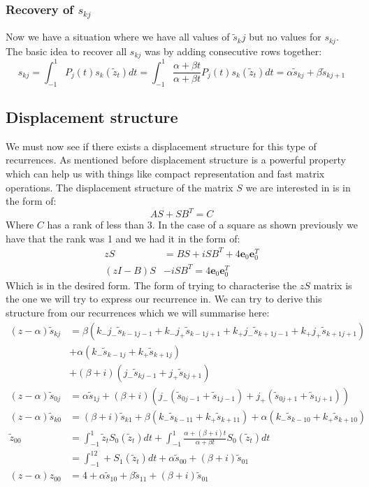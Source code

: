 \documentclass{article}
\begin{document}
\subsubsection{Recovery of $s_{kj}$}
Now we have a situation where we have all values of $\tilde{s}_kj$ but no values for $s_{kj}$.
The basic idea to recover all $s_{kj}$ was by adding consecutive rows together:
$$s_{kj}=\int_{-1}^1P_j(t)s_k(\tilde{z}_t)dt=\int_{-1}^1\frac{\alpha+\beta t}{\alpha+\beta t}P_j(t)s_k(\tilde{z}_t)dt=\alpha\tilde{s}_{kj}+\beta\tilde{s}_{kj+1}$$

\subsection{Displacement structure}
We must now see if there exists a displacement structure for this type of recurrences.
As mentioned before displacement structure\cite{displacement1,displacement2} is a powerful property which can help us with things like compact representation and fast matrix operations.
The displacement structure of the matrix $S$ we are interested in is in the form of:
$$AS+SB^T=C$$
Where $C$ has a rank of less than 3.
In the case of a square as shown previously\cite{logkernel} we have that the rank was 1 and we had it in the form of:
\begin{align}
    zS&=BS+iSB^T+4\textbf{e}_0\textbf{e}_0^T\\
    (zI-B)S&-iSB^T=4\textbf{e}_0\textbf{e}_0^T
\end{align}
Which is in the desired form.
The form of trying to characterise the $zS$ matrix is the one we will try to express our recurrence in.
We can try to derive this structure from our recurrences which we will summarise here:
\begin{align}
    (z-\alpha)\tilde s_{kj}&=\beta(k_-j_-\tilde{s}_{k-1j-1}+k_-j_+\tilde{s}_{k-1j+1}+k_+j_-\tilde{s}_{k+1j-1}+k_+j_+\tilde{s}_{k+1j+1})\\
    &+\alpha(k_-\tilde{s}_{k-1j}+k_+\tilde{s}_{k+1j})\\
    &+(\beta+i)(j_-\tilde{s}_{kj-1}+j_+\tilde{s}_{kj+1})\\
    (z-\alpha)\tilde s_{0j}&=\alpha\tilde{s}_{1j}
    +(\beta+i)(j_-(\tilde{s}_{0j-1}+\tilde{s}_{1j-1})+j_+(\tilde{s}_{0j+1}+\tilde{s}_{1j+1}))\\
    (z-\alpha)\tilde s_{k0}&=(\beta+i)\tilde{s}_{k1}+\beta (k_-\tilde{s}_{k-11}+k_+\tilde{s}_{k+11})
    +\alpha(k_-\tilde{s}_{k-10}+k_+\tilde{s}_{k+10})\\
    \tilde z_{00}&=\int_{-1}^1\tilde z_tS_0(\tilde z_t)dt+\int_{-1}^1\frac{\alpha+(\beta+i)t}{\alpha+\beta t}S_0(\tilde z_t)dt\\
    &=\int_{-1}^12+S_1(\tilde z_t)dt+\alpha\tilde s_{00}+(\beta+i)\tilde s_{01}\\
    (z-\alpha)z_{00}&=4+\alpha\tilde s_{10}+\beta\tilde s_{11}+(\beta+i)\tilde s_{01}
\end{align}
\end{document}
